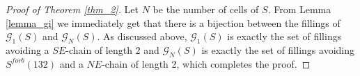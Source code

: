 \begin{proof}[Proof of Theorem \ref{thm_2}]
Let $N$ be the number of cells of $S$.
From Lemma \ref{lemma_gi} we immediately get that there is a bijection between the fillings of $\mathcal{G}_1(S)$ and $\mathcal{G}_N(S)$.
As discussed above, $\mathcal{G}_1(S)$ is exactly the set of fillings avoiding a $SE$-chain of length 2 and $\mathcal{G}_N(S)$
is exactly the set of fillings avoiding $S^{forb}(132)$ and a $NE$-chain of length 2, which completes the proof. 
\end{proof}
